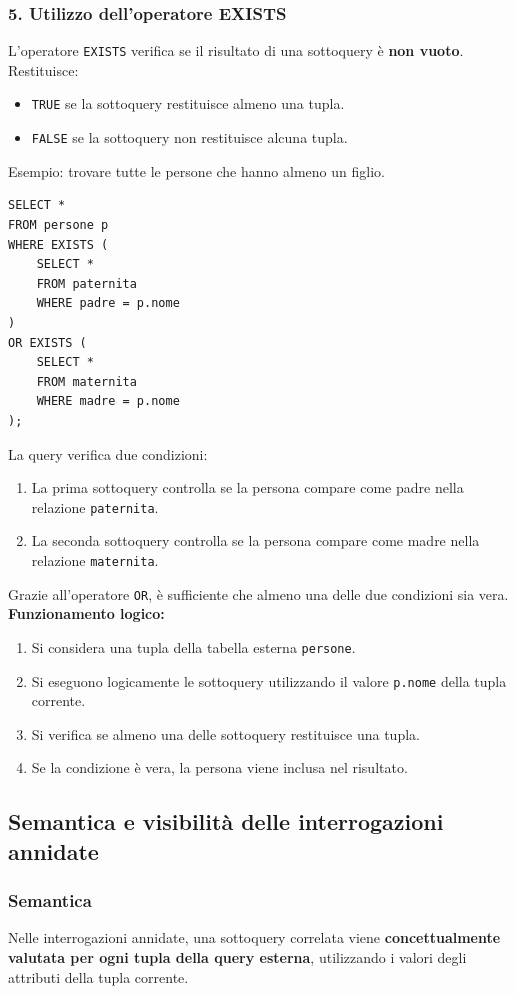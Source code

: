 \subsubsection*{5. Utilizzo dell'operatore EXISTS}
L'operatore \texttt{EXISTS} verifica se il risultato di una sottoquery è \textbf{non vuoto}.
Restituisce:
\begin{itemize}
    \item \texttt{TRUE} se la sottoquery restituisce almeno una tupla.
    \item \texttt{FALSE} se la sottoquery non restituisce alcuna tupla.
\end{itemize}
\textcolor{verdeEsempio}{Esempio:} trovare tutte le persone che hanno almeno un figlio.
\begin{verbatim}
SELECT *
FROM persone p
WHERE EXISTS (
    SELECT *
    FROM paternita
    WHERE padre = p.nome
)
OR EXISTS (
    SELECT *
    FROM maternita
    WHERE madre = p.nome
);
\end{verbatim}
La query verifica due condizioni:
\begin{enumerate}
    \item La prima sottoquery controlla se la persona compare come padre nella relazione \texttt{paternita}.
    \item La seconda sottoquery controlla se la persona compare come madre nella relazione \texttt{maternita}.
\end{enumerate}
Grazie all'operatore \texttt{OR}, è sufficiente che almeno una delle due condizioni sia vera.\medskip\\
\textbf{Funzionamento logico:}
\begin{enumerate}
    \item Si considera una tupla della tabella esterna \texttt{persone}.
    \item Si eseguono logicamente le sottoquery utilizzando il valore \texttt{p.nome} della tupla corrente.
    \item Si verifica se almeno una delle sottoquery restituisce una tupla.
    \item Se la condizione è vera, la persona viene inclusa nel risultato.
\end{enumerate}

\subsection{Semantica e visibilità delle interrogazioni annidate}
\subsubsection*{Semantica}
Nelle interrogazioni annidate, una sottoquery correlata viene
\textbf{concettualmente valutata per ogni tupla della query esterna},
utilizzando i valori degli attributi della tupla corrente.
